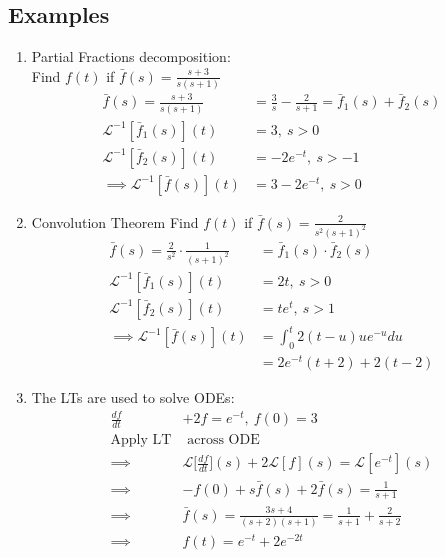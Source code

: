 \documentclass[a4paper, 11pt, normalem]{report}
\newcommand\La{\mathcal{L}}
\begin{document}
\subsection{Examples}
\begin{enumerate}
    \item Partial Fractions decomposition: \\
          Find $f(t)$ if $\bar{f}(s) = \frac{s + 3}{s(s + 1)}$
            \begin{align*}
                \bar{f}(s) = \frac{s + 3}{s(s + 1)} &= \frac{3}{s} - \frac{2}{s + 1} = \bar{f}_{1}(s) + \bar{f}_2 (s) \\
                \La^{-1}[\bar{f}_1 (s)](t) &= 3,~ s > 0 \\
                \La^{-1}[\bar{f}_2 (s)](t) &= -2e^{-t},~ s > -1 \\
                \implies \La^{-1}[\bar{f}(s)](t) &= 3 - 2e^{-t},~ s > 0
            \end{align*}
    \item Convolution Theorem
          Find $f(t)$ if $\bar{f}(s) = \frac{2}{s^2 (s + 1)^2}$
            \begin{align*}
                \bar{f}(s) = \frac{2}{s^2} \cdot \frac{1}{(s + 1)^2} &= \bar{f}_1 (s) \cdot \bar{f}_2 (s) \\
                \La^{-1}[\bar{f}_1 (s)](t) &= 2t,~ s > 0 \\
                \La^{-1}[\bar{f}_2 (s)](t) &= te^t, ~ s > 1 \\
                \implies \La^{-1}[\bar{f}(s)](t) &= \int_{0}^{t} 2(t - u)ue^{-u}du \\
                &= 2e^{-t}(t + 2) + 2(t - 2)
            \end{align*}
    \item The LTs are used to solve ODEs:
            \begin{align*}
                \frac{df}{dt} &+ 2f = e^{-t},~ f(0) = 3 \\
                \text{Apply LT}&\text{ across ODE} \\
                \implies& \La\Big[\frac{df}{dt}\Big](s) + 2\La[f](s) = \La[e^{-t}](s) \\
                \implies& -f(0) + s\bar{f}(s) + 2\bar{f}(s) = \frac{1}{s + 1} \\
                \implies& \bar{f}(s) = \frac{3s + 4}{(s + 2)(s + 1)} = \frac{1}{s + 1} + \frac{2}{s + 2} \\
                \implies& f(t) = e^{-t} + 2e^{-2t}
            \end{align*}

\end{enumerate}
\end{document}
